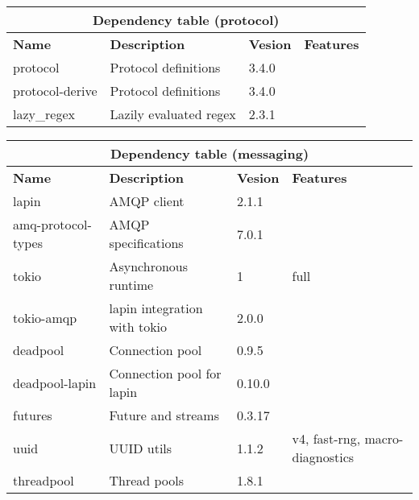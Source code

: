 \documentclass[../documentation.tex]{subfiles}
\begin{document}
\bgroup{}
\def\arraystretch{1.5}
\begin{center}
    \begin{tabular}{ |p{2.3cm}|p{4cm}|p{1.5cm}|p{2cm}| }
        \hline
        \multicolumn{4}{|c|}{\textbf{Dependency table (protocol)}} \\
        \hline
        \textbf{Name} & \textbf{Description} & \textbf{Vesion} & \textbf{Features} \\
        \hline
        protocol & Protocol definitions & 3.4.0 & \\
        \hline
        protocol-derive & Protocol definitions & 3.4.0 & \\
        \hline
        lazy\_regex & Lazily evaluated regex & 2.3.1 & \\
        \hline
    \end{tabular}
\end{center}
\egroup{}

\bgroup{}
\def\arraystretch{1.5}
\begin{center}
    \begin{tabular}{ |p{2.3cm}|p{4cm}|p{1.5cm}|p{2cm}| }
        \hline
        \multicolumn{4}{|c|}{\textbf{Dependency table (messaging)}} \\
        \hline
        \textbf{Name} & \textbf{Description} & \textbf{Vesion} & \textbf{Features} \\
        \hline
        lapin & AMQP client & 2.1.1 & \\
        \hline
        amq-protocol-types & AMQP specifications & 7.0.1 & \\
        \hline
        tokio & Asynchronous runtime & 1 & full \\
        \hline
        tokio-amqp & lapin integration with tokio & 2.0.0 & \\
        \hline
        deadpool & Connection pool & 0.9.5 & \\
        \hline
        deadpool-lapin & Connection pool for lapin & 0.10.0 & \\
        \hline
        futures & Future and streams & 0.3.17 & \\
        \hline
        uuid & UUID utils & 1.1.2 & v4, fast-rng, macro-diagnostics \\
        \hline
        threadpool & Thread pools & 1.8.1 & \\
        \hline
    \end{tabular}
\end{center}
\egroup{}

\end{document}
